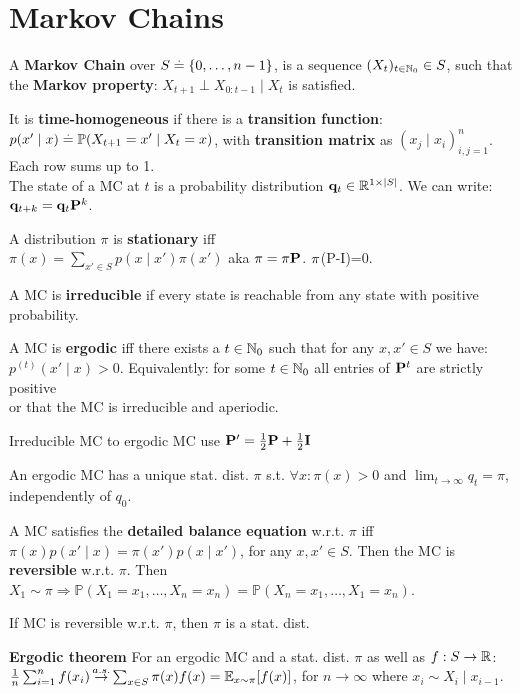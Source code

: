 \section{Markov Chains}
\begin{framed}
    A \textbf{Markov Chain} over $S \overset{.}{=} \{0, \dots, n-1\}$, is a sequence $(X_t)_{t \in \mathbb{N}_0} \in S$, such that the \textbf{Markov property}: $X_{t+1} \perp X_{0:t-1} \mid X_t$ is satisfied. 
\end{framed}
It is \textbf{time-homogeneous} if there is a \textbf{transition function}: $p(x' \mid x) \defeq \Pr{X_{t+1} = x' \mid X_t = x}$, with \textbf{transition matrix} as $\left(x_j \mid x_i \right)_{i, j = 1}^n$. Each row sums up to 1. \\
The state of a MC at $t$ is a probability distribution $\mathbf{q}_t \in \mathbb{R}^{1 \times \left| S \right|}$. We can write: $\mathbf{q}_{t+k} = \mathbf{q}_t \mathbf{P}^k$.
\begin{framed}
    A distribution $\pi$ is \textbf{stationary} iff\\ $\pi(x) = \sum_{x' \in S} p(x \mid x') \pi(x')$ aka $\mathbf{\pi} = \mathbf{\pi} \mathbf{P}$.  $\mathbf{\pi}$(P-I)=0.
\end{framed}
A MC is \textbf{irreducible} if every state is reachable from any state with positive probability.
\begin{framed}
    A MC is \textbf{ergodic} iff there exists a $t \in \mathbb{N}_0$ such that for any $x, x' \in S$ we have: $p^{(t)}(x' \mid x) > 0$. Equivalently:
    for some $t \in \mathbb{N}_0$ all entries of $\mathbf{P}^t$ are strictly positive \\
    or that the MC is irreducible and aperiodic.
\end{framed}
Irreducible MC to ergodic MC use $\mathbf{P}' = \frac{1}{2}\mathbf{P} + \frac{1}{2}\mathbf{I}$
\begin{framed}
    An ergodic MC has a unique stat. dist. $\pi$ s.t. \(\forall x: \pi(x)>0\) and $\lim_{t\to\infty} q_t = \pi$, independently of $q_0$.
\end{framed}
\begin{framed}
    A MC satisfies the \textbf{detailed balance equation} w.r.t. $\pi$ iff $\pi(x) p(x' \mid x) = \pi(x') p(x \mid x')$, for any $x, x' \in S$. Then the MC is \textbf{reversible} w.r.t. $\pi$.
    Then \(X_1\sim \pi \Rightarrow \mathbb{P}(X_1=x_1,\ldots,X_n=x_n)=\mathbb{P}(X_n=x_1,\ldots,X_1=x_n)\).
\end{framed}
If MC is reversible w.r.t. $\pi$, then $\pi$ is a stat. dist.
\begin{framed}
    \textbf{Ergodic theorem} For an ergodic MC and a stat. dist. $\pi$ as well as $f : S \to \mathbb{R}$:
    $\frac{1}{n} \sum_{i=1}^n f(x_i) \almostsurely \sum_{x \in S} \pi(x) f(x) = \E[x \sim \pi]{f(x)}$, for $n\to\infty$ where $x_i \sim X_i \mid x_{i-1}$.
\end{framed}
